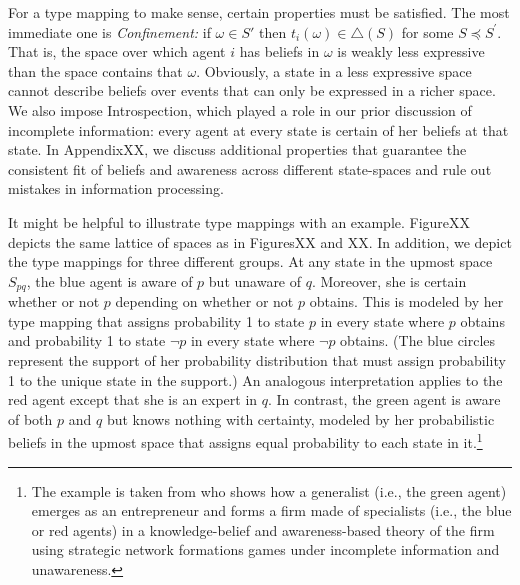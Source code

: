 \documentclass[
11pt,
titlepage,
reqno,
]{article}%
\theoremstyle{definition}
\begin{document}
For a type mapping to make sense, certain properties must be satisfied. The most immediate one is \textit{Confinement:} if $\omega \in S'$ then $t_{i}(\omega )\in \triangle \left( S \right)$ for some $S \preceq S^{\prime}$. That is, the space over which agent $i$ has beliefs in $\omega$ is weakly less expressive than the space contains that $\omega$. Obviously,  a state in a less expressive space cannot describe beliefs over events that can only be expressed in a richer space.  We also impose Introspection, which played a role in our prior discussion of incomplete information: every agent at every state is certain of her beliefs at that state. In AppendixXX, we discuss additional properties that guarantee the consistent fit of beliefs and awareness across different state-spaces and rule out mistakes in information processing.

It might be helpful to illustrate type mappings with an example. FigureXX depicts the same lattice of spaces as in FiguresXX and XX. In addition, we depict the type mappings for three different groups. At any state in the upmost space $S_{pq}$, the blue agent is aware of $p$ but unaware of $q$. Moreover, she is certain whether or not $p$ depending on whether or not $p$ obtains. This is modeled by her type mapping that assigns probability 1 to state $p$ in every state where $p$ obtains and probability 1 to state $\neg p$ in every state where $\neg p$ obtains. (The blue circles represent the support of her probability distribution that must assign probability 1 to the unique state in the support.) An analogous interpretation applies to the red agent except that she is an expert in $q$. In contrast, the green agent is aware of both $p$ and $q$ but knows nothing with certainty, modeled by her probabilistic beliefs in the upmost space that assigns equal probability to each state in it.\footnote{The example is taken from \citet{Schipper2016} who shows how a generalist (i.e., the green agent) emerges as an entrepreneur and forms a firm made of specialists (i.e., the blue or red agents) in a knowledge-belief and awareness-based theory of the firm using strategic network formations games under incomplete information and unawareness.}
\end{document}
